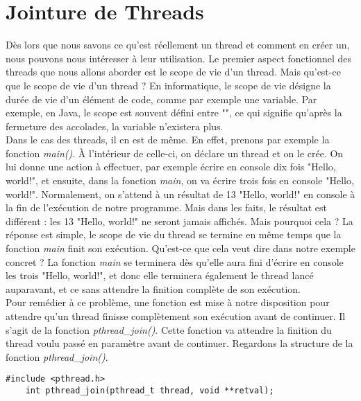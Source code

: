 \section{Jointure de Threads}

Dès lors que nous savons ce qu'est réellement un thread et comment en créer un, nous pouvons nous intéresser à leur utilisation. Le premier aspect fonctionnel des threads que nous allons aborder est le scope de vie d'un thread. Mais qu'est-ce que le scope de vie d'un thread ? En informatique, le scope de vie désigne la durée de vie d'un élément de code, comme par exemple une variable. Par exemple, en Java, le scope est souvent défini entre "{}", ce qui signifie qu'après la fermeture des accolades, la variable n'existera plus.
\\

Dans le cas des threads, il en est de même. En effet, prenons par exemple la fonction \textit{main()}. À l'intérieur de celle-ci, on déclare un thread et on le crée. On lui donne une action à effectuer, par exemple écrire en console dix fois "Hello, world!", et ensuite, dans la fonction \textit{main}, on va écrire trois fois en console "Hello, world!". Normalement, on s'attend à un résultat de 13 "Hello, world!" en console à la fin de l'exécution de notre programme. Mais dans les faits, le résultat est différent : les 13 "Hello, world!" ne seront jamais affichés. Mais pourquoi cela ? La réponse est simple, le scope de vie du thread se termine en même temps que la fonction \textit{main} finit son exécution. Qu'est-ce que cela veut dire dans notre exemple concret ? La fonction \textit{main} se terminera dès qu'elle aura fini d'écrire en console les trois "Hello, world!", et donc elle terminera également le thread lancé auparavant, et ce sans attendre la finition complète de son exécution.
\\

Pour remédier à ce problème, une fonction est mise à notre disposition pour attendre qu'un thread finisse complètement son exécution avant de continuer. Il s'agit de la fonction \textit{pthread\_join()}. Cette fonction va attendre la finition du thread voulu passé en paramètre avant de continuer. Regardons la structure de la fonction \textit{pthread\_join()}.


\begin{lstlisting}
#include <pthread.h>
    int pthread_join(pthread_t thread, void **retval);
\end{lstlisting}
\vspace{\baselineskip}


